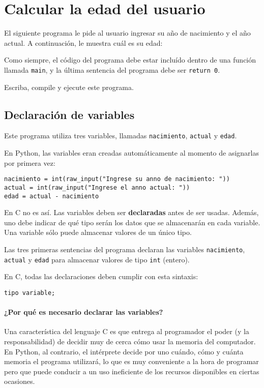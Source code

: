 \chapter{Calcular la edad del usuario}

El siguiente programa le pide al usuario ingresar su año de nacimiento y
el año actual. A continuación, le muestra cuál es su edad:

Como siempre, el código del programa debe estar incluído dentro de una
función llamada \lstinline!main!, y la última sentencia del programa
debe ser \lstinline!return 0!.

Escriba, compile y ejecute este programa.

\section{Declaración de variables}

Este programa utiliza tres variables, llamadas \lstinline!nacimiento!,
\lstinline!actual! y \lstinline!edad!.

En Python, las variables eran creadas automáticamente al momento de
asignarlas por primera vez:

\begin{lstlisting}
nacimiento = int(raw_input("Ingrese su anno de nacimiento: "))
actual = int(raw_input("Ingrese el anno actual: "))
edad = actual - nacimiento
\end{lstlisting}

En C no es así. Las variables deben ser \textbf{declaradas} antes de ser
usadas. Además, uno debe indicar de qué tipo serán los datos que se
almacenarán en cada variable. Una variable sólo puede almacenar valores
de un único tipo.

Las tres primeras sentencias del programa declaran las variables
\lstinline!nacimiento!, \lstinline!actual! y \lstinline!edad! para
almacenar valores de tipo \lstinline!int! (entero).

En C, todas las declaraciones deben cumplir con esta sintaxis:

\begin{lstlisting}
tipo variable;
\end{lstlisting}

\subsubsection{¿Por qué es necesario declarar las variables?}

Una característica del lenguaje C es que entrega al programador el poder
(y la responsabilidad) de decidir muy de cerca cómo usar la memoria del
computador. En Python, al contrario, el intérprete decide por uno
cuándo, cómo y cuánta memoria el programa utilizará, lo que es muy
conveniente a la hora de programar pero que puede conducir a un uso
ineficiente de los recursos disponibles en ciertas ocasiones.

